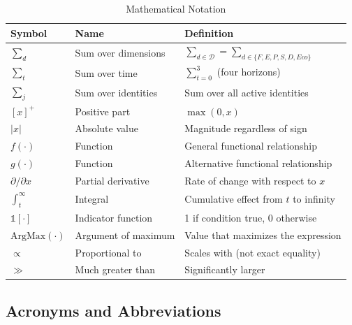 \begin{longtable}{@{}lp{4cm}p{7cm}@{}}
\caption{Mathematical Notation} \\
\toprule
\textbf{Symbol} & \textbf{Name} & \textbf{Definition} \\
\midrule
\endfirsthead
\midrule
\endhead
\bottomrule
\endlastfoot

$\sum_d$ & Sum over dimensions & $\sum_{d \in \mathcal{D}} = \sum_{d \in \{F,E,P,S,D,Eco\}}$ \\
$\sum_t$ & Sum over time & $\sum_{t=0}^{3}$ (four horizons) \\
$\sum_j$ & Sum over identities & Sum over all active identities \\
$[x]^+$ & Positive part & $\max(0, x)$ \\
$|x|$ & Absolute value & Magnitude regardless of sign \\
\addlinespace
$f(\cdot)$ & Function & General functional relationship \\
$g(\cdot)$ & Function & Alternative functional relationship \\
$\partial / \partial x$ & Partial derivative & Rate of change with respect to $x$ \\
$\int_t^\infty$ & Integral & Cumulative effect from $t$ to infinity \\
\addlinespace
$\mathbb{1}[\cdot]$ & Indicator function & 1 if condition true, 0 otherwise \\
$\text{ArgMax}(\cdot)$ & Argument of maximum & Value that maximizes the expression \\
$\propto$ & Proportional to & Scales with (not exact equality) \\
$\gg$ & Much greater than & Significantly larger \\

\end{longtable}

\subsection{Acronyms and Abbreviations}

